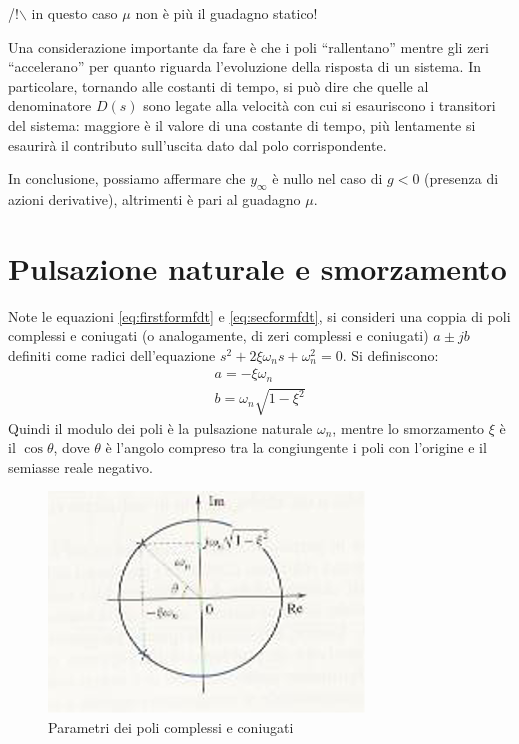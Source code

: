 \documentclass[a4paper]{report}
\begin{document}
/!$\backslash$ in questo caso $\mu$ non \`e pi\`u il guadagno statico!

Una considerazione importante da fare \`e che i poli ``rallentano'' mentre
gli zeri ``accelerano'' per quanto riguarda l'evoluzione della risposta di
un sistema. In particolare, tornando alle costanti di tempo, si pu\`o dire
che quelle al denominatore $D(s)$ sono legate alla velocit\`a con cui si
esauriscono i transitori del sistema: maggiore \`e il valore di
una costante di tempo, pi\`u lentamente si esaurir\`a il contributo
sull'uscita dato dal polo corrispondente.

In conclusione, possiamo affermare che $y_{\infty}$ \`e nullo nel caso
di $g < 0$ (presenza di azioni derivative), altrimenti \`e pari al
guadagno $\mu$.

\section{Pulsazione naturale e smorzamento}\label{par:pulsazsmorz}
Note le equazioni \ref{eq:firstformfdt} e \ref{eq:secformfdt}, si
consideri una coppia di poli complessi e coniugati (o analogamente, di
zeri complessi e coniugati) $a \pm jb$ definiti come radici
dell'equazione $s^2 + 2\xi \omega_ns + \omega^2_n = 0$. Si definiscono:
\begin{eqnarray}
a=-\xi\omega_n\\
b=\omega_n\sqrt{1-\xi^2}
\end{eqnarray}
Quindi il modulo dei poli \`e la pulsazione naturale
$\omega_n$, mentre
lo smorzamento $\xi$ \`e il $\cos \theta$, dove
$\theta$ \`e l'angolo compreso tra la congiungente i poli con
l'origine e il semiasse reale negativo. 
\begin{figure}[!h]
  \begin{center}
    \includegraphics[scale=0.5]{./figures/complconj.png}
    \caption{Parametri dei poli complessi e coniugati}\label{fig:complparms}
  \end{center}
\end{figure}
\end{document}
